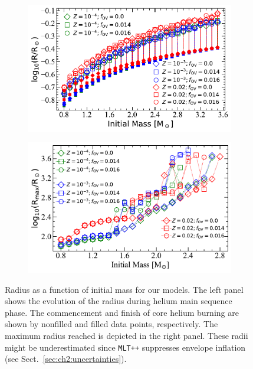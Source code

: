 \documentclass[main.tex]{subfiles}
\begin{document}
\begin{figure}[h!]
    \centering
    \begin{subfigure}{0.5\textwidth}
      \centering
      \includegraphics[width=0.95\columnwidth]{figures/chapter2/mass_radius/radius_vs_mass_tams.pdf}
    \end{subfigure}%
    \begin{subfigure}{0.5\textwidth}
      \centering
      \includegraphics[width=0.95\columnwidth]{figures/chapter2/mass_radius/mass_radius.pdf}
    \end{subfigure}
    \caption{Radius as a function of initial mass for our \seriesone models. The left panel shows the evolution of the radius during helium main sequence phase. The commencement and finish of core helium burning are shown by nonfilled and filled data points, respectively. The maximum radius reached is depicted in the right panel. These radii might be underestimated since \texttt{MLT++}  suppresses envelope inflation (see Sect.~\ref{sec:ch2:uncertainties}).}
    \label{fig:mass_radius}
\end{figure}
\end{document}
